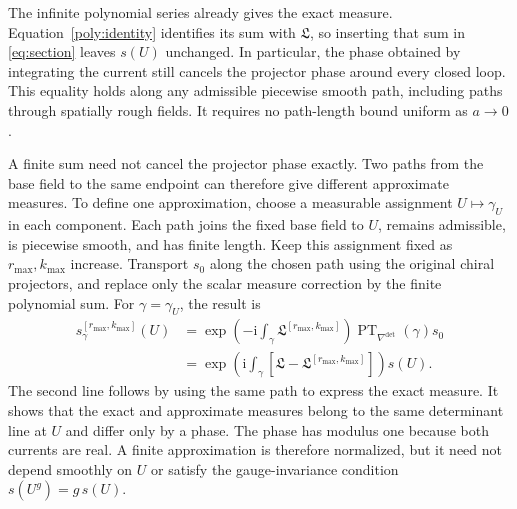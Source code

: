 \documentclass[11pt,a4paper]{article}
\theoremstyle{remark}
\newcommand{\ii}{\mathrm i}
\begin{document}
The infinite polynomial series already gives the exact measure.
Equation~\eqref{poly:identity} identifies its sum with
$\mathfrak L$, so inserting that sum in \eqref{eq:section}
leaves $s(U)$ unchanged. In particular, the phase obtained by
integrating the current still cancels the projector phase around
every closed loop. This equality holds along any admissible piecewise
smooth path, including paths through spatially rough fields. It
requires no path-length bound uniform as $a\to0$.

A finite sum need not cancel the projector phase exactly. Two paths
from the base field to the same endpoint can therefore give different
approximate measures. To define one approximation, choose a measurable
assignment $U\mapsto\gamma_U$ in each component. Each path joins
the fixed base field to $U$, remains admissible, is piecewise smooth,
and has finite length. Keep this assignment fixed as
$r_{\max},k_{\max}$ increase. Transport $s_0$ along the chosen
path using the original chiral projectors, and replace only the
scalar measure correction by the finite polynomial sum. For
$\gamma=\gamma_U$, the result is
\begin{equation}
\begin{aligned}
 s_\gamma^{[r_{\max},k_{\max}]}(U)
 &=\exp\left(-\ii\int_\gamma
                   \mathfrak L^{[r_{\max},k_{\max}]}\right)
       \operatorname{PT}_{\nabla^{\det}}(\gamma)s_0\\
 &=\exp\left(\ii\int_\gamma
         [\mathfrak L-\mathfrak L^{[r_{\max},k_{\max}]}]\right)
       s(U).
\end{aligned}
\label{phys:approximate-phase}
\end{equation}
The second line follows by using the same path to express the exact
measure. It shows that the exact and approximate measures belong to
the same determinant line at $U$ and differ only by a phase.
The phase has modulus one because both currents are real. A finite
approximation is therefore normalized, but it need not depend smoothly
on $U$ or satisfy the gauge-invariance condition $s(U^g)=g\,s(U)$.
\end{document}
